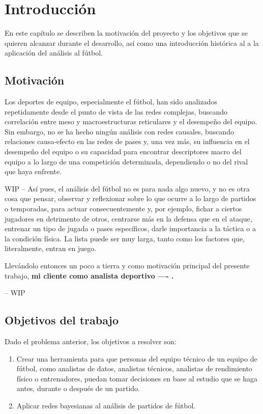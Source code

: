 \chapter{Introducción}

En este capítulo se describen la motivación del proyecto y los objetivos que
se quieren alcanzar durante el desarrollo, así como una introducción histórica al
a la aplicación del análisis al fútbol. 

\section{Motivación}

Los deportes de equipo, especialmente el fútbol, han sido analizados 
repetidamente desde el punto de vista de las redes complejas, buscando 
correlación entre meso y macroestructuras reticulares y el desempeño del 
equipo. Sin embargo, no se ha hecho ningún análisis con redes causales, 
buscando relaciones causa-efecto en las redes de pases y, una vez más, 
su influencia en el desempeño del equipo o su capacidad para encontrar 
descriptores macro del equipo a lo largo de una competición determinada, 
dependiendo o no del rival que haya enfrente.

WIP --
Así pues, el análisis del fútbol no es para nada algo nuevo, y no es otra cosa que 
pensar, observar y reflexionar sobre lo que ocurre a lo largo de partidos 
o temporadas, para actuar consecuentemente y, por ejemplo, fichar a 
ciertos jugadores en detrimento de otros, centrarse más en la defensa 
que en el ataque, entrenar un tipo de jugada o pases específicos, darle 
importancia a la táctica o a la condición física. La lista puede ser muy 
larga, tanto como los factores que, literalmente, entran en juego.

Llevándolo entonces un poco a tierra y como motivación principal del presente trabajo,
\textbf{mi cliente como analista deportivo ---- .}

-- WIP 

\section{Objetivos del trabajo} \label{sect:goals}

Dado el problema anterior, los objetivos a resolver son:

\begin{enumerate}
    \item \label{obj:1} Crear una herramienta para que personas del equipo técnico de
    un equipo de fútbol, como analistas de datos, analistas técnicos, analistas de rendimiento 
    físico o entrenadores, puedan tomar decisiones en base al estudio que se haga antes, durante 
    o después de un partido. 
    \item \label{obj:2} Aplicar redes bayesianas al análisis de partidos de fútbol.
\end{enumerate}


